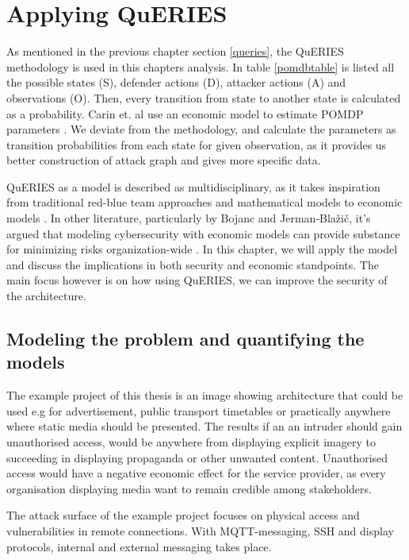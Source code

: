 \chapter{Applying QuERIES} \label{analysis}

As mentioned in the previous chapter section \ref{queries}, the
QuERIES methodology is used in this chapters analysis. In table
\ref{pomdbtable} is listed all the possible states (S), defender
actions (D), attacker actions (A) and observations (O). Then, every
transition from state to another state is calculated as a
probability. Carin et. al use an economic model to estimate POMDP
parameters \cite{carin2008cybersecurity}. We deviate from the
methodology, and calculate the parameters as transition probabilities
from each state for given observation, as it provides us better
construction of attack graph and gives more specific data.

QuERIES as a model is described as multidisciplinary, as it takes
inspiration from traditional red-blue team approaches and mathematical
models to economic models \cite{hughes2013quantitative}. In other
literature, particularly by Bojanc and Jerman-Blažič, it's argued that
modeling cybersecurity with economic models can provide substance for
minimizing risks organization-wide \cite{jerman2008economic}. In this
chapter, we will apply the model and discuss the implications in both
security and economic standpoints. The main focus however is on how
using QuERIES, we can improve the security of the architecture.

\section{Modeling the problem and quantifying the models} \label{modprob}

The example project of this thesis is an image showing architecture that
could be used e.g for advertisement, public transport timetables or
practically anywhere where static media should be presented. The
results if an an intruder should gain unauthorised access, would be
anywhere from displaying explicit imagery to succeeding in displaying
propaganda or other unwanted content. Unauthorised access would have a
negative economic effect for the service provider, as every
organisation displaying media want to remain credible among
stakeholders.

The attack surface of the example project focuses on physical access
and vulnerabilities in remote connections. With MQTT-messaging, SSH
and display protocols, internal and external messaging takes place.

